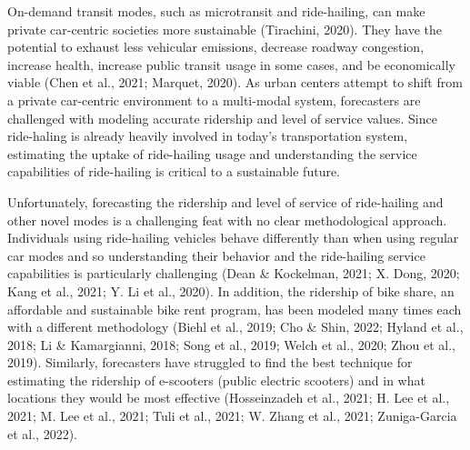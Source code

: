 \documentclass[fancy, masters]{byuthesis}
\begin{document}
On-demand transit modes, such as microtransit and ride-hailing, can make private car-centric societies more sustainable (Tirachini, 2020). They have the potential to exhaust less vehicular emissions, decrease roadway congestion, increase health, increase public transit usage in some cases, and be economically viable (Chen et al., 2021; Marquet, 2020). As urban centers attempt to shift from a private car-centric environment to a multi-modal system, forecasters are challenged with modeling accurate ridership and level of service values. Since ride-haling is already heavily involved in today's transportation system, estimating the uptake of ride-hailing usage and understanding the service capabilities of ride-hailing is critical to a sustainable future.

Unfortunately, forecasting the ridership and level of service of ride-hailing and other novel modes is a challenging feat with no clear methodological approach. Individuals using ride-hailing vehicles behave differently than when using regular car modes and so understanding their behavior and the ride-hailing service capabilities is particularly challenging (Dean \& Kockelman, 2021; X. Dong, 2020; Kang et al., 2021; Y. Li et al., 2020). In addition, the ridership of bike share, an affordable and sustainable bike rent program, has been modeled many times each with a different methodology (Biehl et al., 2019; Cho \& Shin, 2022; Hyland et al., 2018; Li \& Kamargianni, 2018; Song et al., 2019; Welch et al., 2020; Zhou et al., 2019). Similarly, forecasters have struggled to find the best technique for estimating the ridership of e-scooters (public electric scooters) and in what locations they would be most effective (Hosseinzadeh et al., 2021; H. Lee et al., 2021; M. Lee et al., 2021; Tuli et al., 2021; W. Zhang et al., 2021; Zuniga-Garcia et al., 2022).
\end{document}
